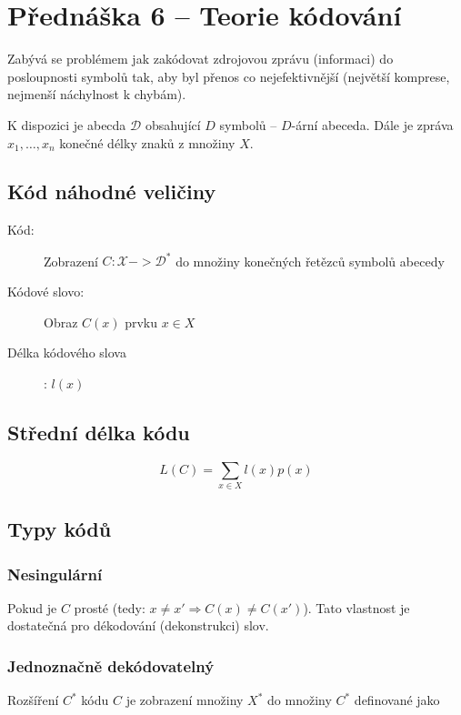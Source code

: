 \section{Přednáška 6 -- Teorie kódování}

Zabývá se problémem jak zakódovat zdrojovou zprávu (informaci) do posloupnosti symbolů tak, aby byl přenos co nejefektivnější (největší komprese, nejmenší náchylnost k chybám).

K dispozici je abecda $\mathcal{D}$ obsahující $D$ symbolů -- $D$-ární abeceda.
Dále je zpráva $x_1, \dots, x_n$ konečné délky znaků z množiny $X$.

\subsection{Kód náhodné veličiny}

\begin{description}
    \item[Kód:] Zobrazení $C: \mathcal{X} -> \mathcal{D}^*$ do množiny konečných řetězců symbolů abecedy
    \item[Kódové slovo:] Obraz $C(x)$ prvku $x \in X$
    \item[Délka kódového slova]: $l(x)$
\end{description}

\subsection{Střední délka kódu}

$$
    L(C) = \sum_{x\in X}{l(x)p(x)}
$$

\subsection{Typy kódů}

\subsubsection*{Nesingulární}

Pokud je $C$ prosté (tedy: $x\neq x' \Rightarrow C(x) \neq C(x')$).
Tato vlastnost je dostatečná pro dékodování (dekonstrukci) slov.

\subsubsection*{Jednoznačně dekódovatelný}

Rozšíření $C^*$ kódu $C$ je zobrazení množiny $X^*$ do množiny $C^*$ definované jako

